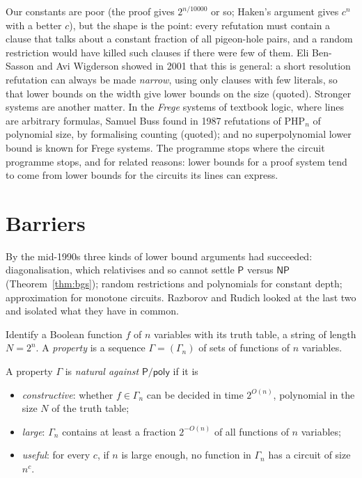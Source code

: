 Our constants are poor (the proof gives $2^{n/10000}$ or so; Haken's argument gives $c^n$ with a better $c$), but the shape is the point: every refutation must contain a clause that talks about a constant fraction of all pigeon-hole pairs, and a random restriction would have killed such clauses if there were few of them. Eli Ben-Sasson and Avi Wigderson showed in 2001 that this is general: a short resolution refutation can always be made \emph{narrow}, using only clauses with few literals, so that lower bounds on the width give lower bounds on the size (quoted). Stronger systems are another matter. In the \emph{Frege} systems of textbook logic, where lines are arbitrary formulas, Samuel Buss found in 1987 refutations of $\mathrm{PHP}_n$ of polynomial size, by formalising counting (quoted); and no superpolynomial lower bound is known for Frege systems. The programme stops where the circuit programme stops, and for related reasons: lower bounds for a proof system tend to come from lower bounds for the circuits its lines can express.

\section{Barriers}\label{sec:barriers}

By the mid-1990s three kinds of lower bound arguments had succeeded: diagonalisation, which relativises and so cannot settle $\mathsf P$ versus $\mathsf{NP}$ (Theorem~\ref{thm:bgs}); random restrictions and polynomials for constant depth; approximation for monotone circuits. Razborov and Rudich looked at the last two and isolated what they have in common.

Identify a Boolean function $f$ of $n$ variables with its truth table, a string of length $N=2^n$. A \emph{property} is a sequence $\Gamma=(\Gamma_n)$ of sets of functions of $n$ variables.

\begin{definition}\label{def:natural}
A property $\Gamma$ is \emph{natural against} $\mathsf P/\mathsf{poly}$ if it is
\begin{itemize}
\item \emph{constructive}: whether $f\in\Gamma_n$ can be decided in time $2^{O(n)}$, polynomial in the size $N$ of the truth table;
\item \emph{large}: $\Gamma_n$ contains at least a fraction $2^{-O(n)}$ of all functions of $n$ variables;
\item \emph{useful}: for every $c$, if $n$ is large enough, no function in $\Gamma_n$ has a circuit of size $n^c$.
\end{itemize}
\end{definition}

